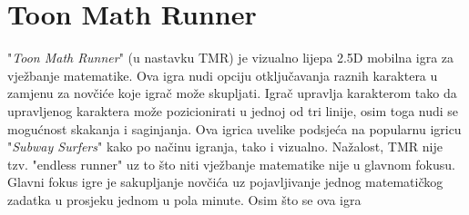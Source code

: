 \documentclass[times, utf8, zavrsni, numeric]{fer}
\begin{document}
	\section{Toon Math Runner} 
	"\textit{Toon Math Runner}" (u nastavku TMR) je vizualno lijepa 2.5D mobilna igra za vježbanje matematike. Ova igra nudi opciju otključavanja raznih karaktera u zamjenu za novčiće koje igrač može skupljati. Igrač upravlja karakterom
		tako da upravljenog karaktera može pozicionirati u jednoj od tri linije, osim toga nudi se mogućnost skakanja i saginjanja. Ova igrica uvelike podsjeća na popularnu igricu "\textit{Subway Surfers}" kako po načinu igranja, tako i vizualno.
	 Nažalost, TMR nije tzv. "endless runner" uz to što niti vježbanje matematike nije u glavnom fokusu. Glavni fokus igre je sakupljanje novčića uz pojavljivanje jednog matematičkog zadatka u prosjeku jednom u pola minute. Osim što se ova igra 
\end{document}
